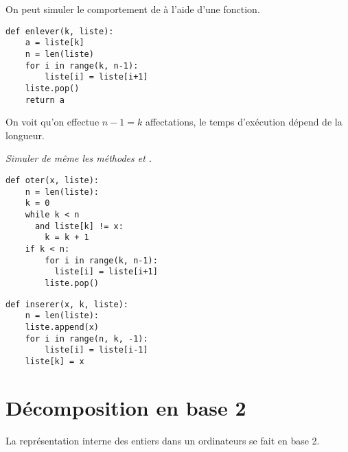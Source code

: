 On peut simuler le comportement de  à l'aide d'une fonction.
\begin{lstlisting}
def enlever(k, liste):
    a = liste[k]
    n = len(liste)
    for i in range(k, n-1):
        liste[i] = liste[i+1]
    liste.pop()
    return a
\end{lstlisting}
On voit qu'on effectue $n-1=k$ affectations, le temps d'exécution dépend de la longueur.
\begin{Exercise}\it 
Simuler de même les méthodes  et .
\end{Exercise}
\begin{Answer}

\medskip

\begin{minipage}{0.53\textwidth}
\begin{lstlisting}
def oter(x, liste):
    n = len(liste):
    k = 0
    while k < n 
      and liste[k] != x:
        k = k + 1
    if k < n:
        for i in range(k, n-1):
          liste[i] = liste[i+1]
        liste.pop()
\end{lstlisting}
\end{minipage}
\begin{minipage}{0.47\textwidth}
\begin{lstlisting}
def inserer(x, k, liste):
    n = len(liste):
    liste.append(x)
    for i in range(n, k, -1):
        liste[i] = liste[i-1]
    liste[k] = x
\end{lstlisting}
\end{minipage}
\end{Answer}
\section{Décomposition en base 2}
La représentation interne des entiers dans un ordinateurs se fait en base 2.


